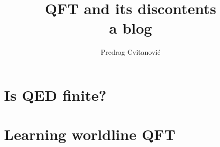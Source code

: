 \documentclass[10pt,openany]{book}
\title{QFT and its discontents
       \\ \Huge a blog}
\author{Predrag Cvitanovi\'{c}}
\begin{document}
\maketitle

\tableofcontents

\chapter{Is QED finite?}
\label{c-finiteQED}

\newpage



\newpage
\printbibliography[heading=subbibintoc,title={References}]

\newpage
\chapter{Learning worldline QFT}


\newpage

\end{document}
